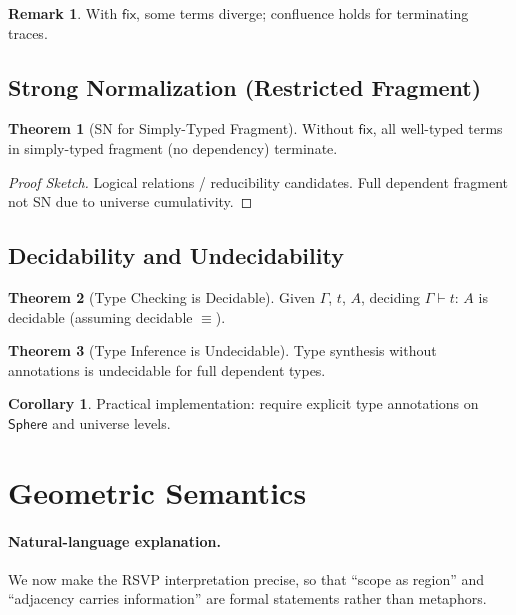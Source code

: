 \documentclass[12pt]{article}
\newcommand{\Entails}{\vdash}
\newcommand{\Types}{:\,}
\newcommand{\Sphere}{\mathsf{Sphere}}
\newcommand{\Ctx}{\Gamma}
\theoremstyle{definition}
\newtheorem{theorem}{Theorem}
\newtheorem{corollary}{Corollary}
\newtheorem{remark}{Remark}
\begin{document}
\begin{remark}
With $\mathsf{fix}$, some terms diverge; confluence holds for terminating traces.
\end{remark}

\subsection{Strong Normalization (Restricted Fragment)}
\begin{theorem}[SN for Simply-Typed Fragment]
Without $\mathsf{fix}$, all well-typed terms in simply-typed fragment (no dependency) terminate.
\end{theorem}
\begin{proof}[Proof Sketch]
Logical relations / reducibility candidates. Full dependent fragment not SN due to universe cumulativity.
\end{proof}

\subsection{Decidability and Undecidability}
\begin{theorem}[Type Checking is Decidable]
Given $\Ctx$, $t$, $A$, deciding $\Ctx \Entails t \Types A$ is decidable (assuming decidable $\equiv$).
\end{theorem}

\begin{theorem}[Type Inference is Undecidable]
Type synthesis without annotations is undecidable for full dependent types.
\end{theorem}

\begin{corollary}
Practical implementation: require explicit type annotations on $\Sphere$ and universe levels.
\end{corollary}

\section{Geometric Semantics}\label{sec:geom}
\paragraph{Natural-language explanation.}
We now make the RSVP interpretation precise, so that ``scope as region'' and ``adjacency carries information'' are formal statements rather than metaphors.
\end{document}
